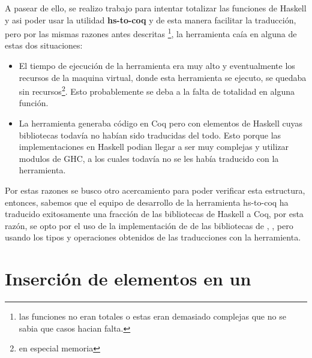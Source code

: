  A pasear de ello, se realizo trabajo para intentar totalizar las funciones de Haskell y asi poder usar
 la utilidad \textbf{hs-to-coq} y de esta manera facilitar la traducci\'on, pero por las mismas
 razones antes descritas \footnote{las funciones no eran totales o estas eran demasiado complejas
 que no se sabia que casos hacian falta.}, la herramienta caía en alguna de estas dos situaciones:

\begin{itemize}
    \item El tiempo de ejecuci\'on de la herramienta era muy alto y eventualmente los recursos de
    la maquina virtual, donde esta herramienta se ejecuto, se quedaba sin recursos\footnote{en
    especial memoria}. Esto probablemente se deba a la falta de totalidad en alguna función.
    \item La herramienta generaba c\'odigo en Coq pero con elementos de Haskell cuyas bibliotecas
    todavía no habían sido traducidas del todo. Esto porque las implementaciones en Haskell podian
    llegar a ser muy complejas y utilizar modulos de GHC, a los cuales todav\'ia no se les hab\'ia
    traducido con la herramienta.
\end{itemize}{}

Por estas razones se busco otro acercamiento para poder verificar esta estructura, entonces,
sabemos que el equipo de desarrollo de la herramienta hs-to-coq ha traducido exitosamente una
fracci\'on de las bibliotecas de Haskell a Coq, por esta raz\'on, se opto por el uso de la
implementación de {\arns} de las bibliotecas de {\coq}, \cite{MSetRBT}, pero usando los tipos y
operaciones obtenidos de las traducciones con la herramienta.

\section{Inserción de elementos en un {\arn}}

